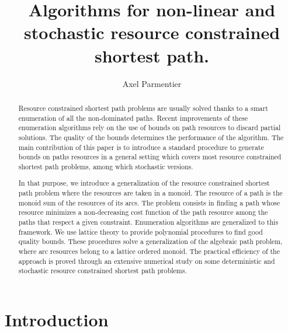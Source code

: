 \documentclass[11pt]{amsart}
\theoremstyle{plain}
\theoremstyle{remark}
\begin{document}
\title{Algorithms for non-linear and stochastic resource constrained shortest path.}

\author{Axel Parmentier}

\address{A. Parmentier, \'Ecole Nationale des Ponts et Chauss\'ees, CERMICS, 6-8 avenue Blaise Pascal, Cit\'e Descartes, 77455 Marne-la-Vall\'ee, Cedex 2, France}





\begin{abstract}

Resource constrained shortest path problems are usually solved thanks to a smart enumeration of all the non-dominated paths. Recent improvements of these enumeration algorithms rely on the use of bounds on path resources to discard partial solutions. 
The quality of the bounds determines the performance of the algorithm. The main contribution of this paper is to introduce a standard procedure to generate bounds on paths resources in a general setting which covers most resource constrained shortest path problems, among which stochastic versions. 

In that purpose, we introduce a generalization of the resource constrained shortest path problem where the resources are taken in a monoid. The resource of a path is the monoid sum of the resources of its arcs. The problem consists in finding a path whose resource minimizes a non-decreasing cost function of the path resource among the paths that respect a given constraint. 
Enumeration algorithms are generalized to this framework. We use lattice theory to provide polynomial procedures to find good quality bounds. These procedures solve a generalization of the algebraic path problem, where arc resources belong to a lattice ordered monoid. The practical efficiency of the approach is proved through an extensive numerical study on some deterministic and stochastic resource constrained shortest path problems.





\end{abstract}

\maketitle


\section{Introduction} \label{sec:introduction}
\end{document}
